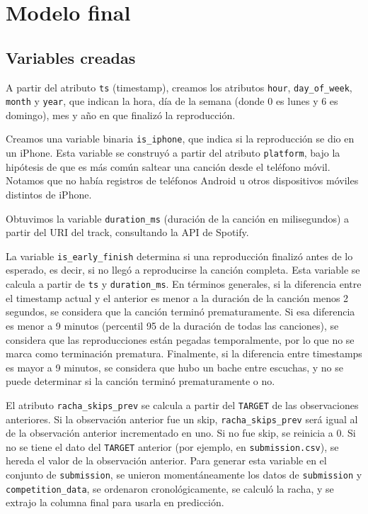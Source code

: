 \documentclass{article}
\begin{document}
\section*{Modelo final}
\subsection*{Variables creadas}

A partir del atributo \texttt{ts} (timestamp), creamos los atributos \texttt{hour}, \texttt{day\_of\_week}, \texttt{month} y \texttt{year}, que indican la hora, día de la semana (donde 0 es lunes y 6 es domingo), mes y año en que finalizó la reproducción.

Creamos una variable binaria \texttt{is\_iphone}, que indica si la reproducción se dio en un iPhone. Esta variable se construyó a partir del atributo \texttt{platform}, bajo la hipótesis de que es más común saltear una canción desde el teléfono móvil. Notamos que no había registros de teléfonos Android u otros dispositivos móviles distintos de iPhone.

Obtuvimos la variable \texttt{duration\_ms} (duración de la canción en milisegundos) a partir del URI del track, consultando la API de Spotify.

La variable \texttt{is\_early\_finish} determina si una reproducción finalizó antes de lo esperado, es decir, si no llegó a reproducirse la canción completa. Esta variable se calcula a partir de \texttt{ts} y \texttt{duration\_ms}. En términos generales, si la diferencia entre el timestamp actual y el anterior es menor a la duración de la canción menos 2 segundos, se considera que la canción terminó prematuramente. Si esa diferencia es menor a 9 minutos (percentil 95 de la duración de todas las canciones), se considera que las reproducciones están pegadas temporalmente, por lo que no se marca como terminación prematura. Finalmente, si la diferencia entre timestamps es mayor a 9 minutos, se considera que hubo un bache entre escuchas, y no se puede determinar si la canción terminó prematuramente o no.

El atributo \texttt{racha\_skips\_prev} se calcula a partir del \texttt{TARGET} de las observaciones anteriores. Si la observación anterior fue un skip, \texttt{racha\_skips\_prev} será igual al de la observación anterior incrementado en uno. Si no fue skip, se reinicia a 0. Si no se tiene el dato del \texttt{TARGET} anterior (por ejemplo, en \texttt{submission.csv}), se hereda el valor de la observación anterior. Para generar esta variable en el conjunto de \texttt{submission}, se unieron momentáneamente los datos de \texttt{submission} y \texttt{competition\_data}, se ordenaron cronológicamente, se calculó la racha, y se extrajo la columna final para usarla en predicción.
\end{document}
